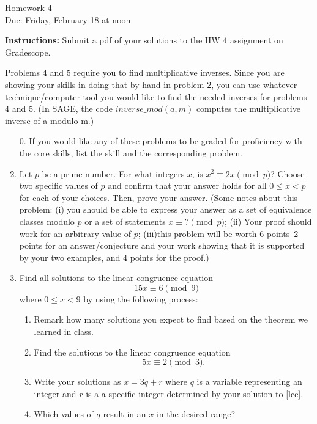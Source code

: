 \documentclass[12pt]{article}
\begin{document}
\begin{center}
{\Large Homework 4}\\
Due: Friday,  February 18 at noon\\


\end{center}
{\bf Instructions:} Submit a pdf of your solutions to the HW 4 assignment on Gradescope. 


 Problems 4 and 5 require you to find multiplicative inverses. Since you are showing your skills in doing that by hand in problem 2, you can use whatever technique/computer tool you would like to find the needed inverses for problems 4 and 5.  (In SAGE, the code $inverse\_mod(a,m)$ computes the multiplicative inverse of a modulo m.)

\begin{enumerate}
\item[0.] If you would like any of these problems to be graded for proficiency with the core skills, list the skill and the corresponding problem. 
\item Let $p$ be a prime number.  For what integers $x$, is $x^2\equiv 2x\pmod{p}$? Choose two specific values of $p$ and confirm that your answer holds for all $0\le x<p$ for each of your choices. Then, prove your answer.  (Some notes about this problem: (i) you should be able to express your answer as a set of equivalence classes modulo $p$ or a set of statements $x\equiv ?\pmod{p}$; (ii) Your proof should work for an arbitrary value of $p$; (iii)this problem will be worth 6 points--2 points for an answer/conjecture and your work showing that it is supported by your two examples, and $4$ points for the proof.)
\item Find all solutions to the linear congruence equation $$15x\equiv 6\pmod{9}$$ where $0\le x<9$ by using the following process:
\begin{enumerate}
\item Remark how many solutions you expect to find based on the theorem we learned in class.
\item Find the solutions to the linear congruence equation \begin{equation}\label{lce}
5x\equiv 2\pmod{3}.
\end{equation}
\item Write your solutions as $x=3q+r$ where $q$ is a variable representing an integer and $r$ is a a specific integer determined by your solution to \eqref{lce}.
\item Which values of $q$ result in an $x$ in the desired range?

\end{enumerate}
\end{enumerate}
\end{document}
